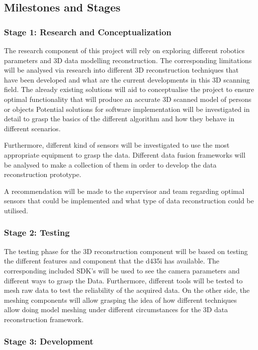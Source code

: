 \documentclass[12pt]{report}
\begin{document}
\subsection{Milestones and Stages}
\subsubsection{ Stage 1: Research and Conceptualization }
The research component of this project will rely on exploring different robotics parameters and 3D data modelling reconstruction. 
The corresponding limitations will be analysed via research into different 3D reconstruction techniques that have been developed and what are the current developments in this 3D scanning field. 
The already existing solutions will aid to conceptualise the project to ensure optimal functionality that will produce an accurate 3D scanned model of persons or objects
Potential solutions for software implementation will be investigated in detail to grasp the basics of the different algorithm and how they behave in different scenarios. 

Furthermore, different kind of sensors will be investigated to use the most appropriate equipment to grasp the data. Different data fusion frameworks will be analysed to make a collection of them in order to develop the data reconstruction prototype. 

A recommendation will be made to the supervisor and team regarding optimal sensors that could be implemented and what type of data reconstruction could be utilised. 
\enlargethispage{\baselineskip}

\subsubsection{Stage 2: Testing}
The testing phase for the 3D reconstruction component will be based on testing the different features and component that the d435i has available. The corresponding included SDK’s will be used to see the camera parameters and different ways to grasp the Data. 
Furthermore, different tools will be tested to mesh raw data to test the reliability of the acquired data. 
On the other side, the meshing components will allow grasping the idea of how different techniques allow doing model meshing under different circumstances for the 3D data reconstruction framework. 

\subsubsection{Stage 3: Development}
\end{document}
